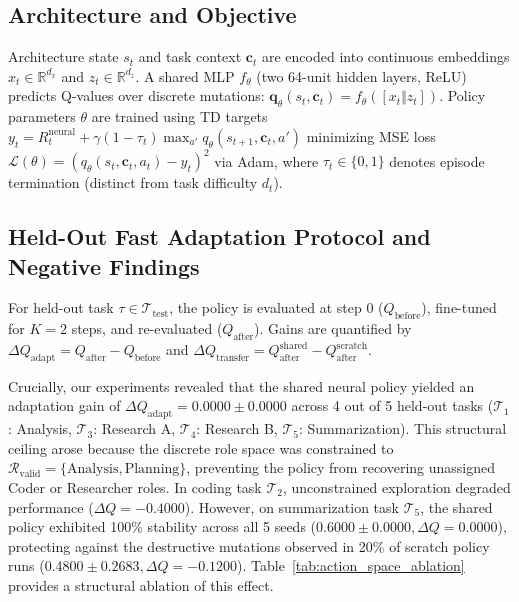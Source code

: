 \documentclass[conference]{IEEEtran}
\begin{document}
\subsection{Architecture and Objective}
Architecture state $s_t$ and task context $\mathbf{c}_t$ are encoded into continuous embeddings $x_t \in \mathbb{R}^{d_x}$ and $z_t \in \mathbb{R}^{d_z}$. A shared MLP $f_\theta$ (two 64-unit hidden layers, ReLU) predicts Q-values over discrete mutations: $\mathbf{q}_\theta(s_t, \mathbf{c}_t) = f_\theta([x_t \Vert z_t])$. Policy parameters $\theta$ are trained using TD targets $y_t = R_t^{\mathrm{neural}} + \gamma(1 - \tau_t) \max_{a'} q_\theta(s_{t+1}, \mathbf{c}_t, a')$ minimizing MSE loss $\mathcal{L}(\theta) = (q_\theta(s_t, \mathbf{c}_t, a_t) - y_t)^2$ via Adam, where $\tau_t \in \{0, 1\}$ denotes episode termination (distinct from task difficulty $d_t$).

\subsection{Held-Out Fast Adaptation Protocol and Negative Findings}
For held-out task $\tau \in \mathcal{T}_{\mathrm{test}}$, the policy is evaluated at step 0 ($Q_{\mathrm{before}}$), fine-tuned for $K=2$ steps, and re-evaluated ($Q_{\mathrm{after}}$). Gains are quantified by $\Delta Q_{\mathrm{adapt}} = Q_{\mathrm{after}} - Q_{\mathrm{before}}$ and $\Delta Q_{\mathrm{transfer}} = Q_{\mathrm{after}}^{\mathrm{shared}} - Q_{\mathrm{after}}^{\mathrm{scratch}}$.

Crucially, our experiments revealed that the shared neural policy yielded an adaptation gain of $\Delta Q_{\mathrm{adapt}} = \mathbf{0.0000 \pm 0.0000}$ across 4 out of 5 held-out tasks ($\mathcal{T}_1$: Analysis, $\mathcal{T}_3$: Research A, $\mathcal{T}_4$: Research B, $\mathcal{T}_5$: Summarization). This structural ceiling arose because the discrete role space was constrained to $\mathcal{R}_{\mathrm{valid}} = \{\text{Analysis}, \text{Planning}\}$, preventing the policy from recovering unassigned Coder or Researcher roles. In coding task $\mathcal{T}_2$, unconstrained exploration degraded performance ($\Delta Q = -0.4000$). However, on summarization task $\mathcal{T}_5$, the shared policy exhibited 100\% stability across all 5 seeds ($0.6000 \pm 0.0000, \Delta Q = 0.0000$), protecting against the destructive mutations observed in 20\% of scratch policy runs ($0.4800 \pm 0.2683, \Delta Q = -0.1200$). Table~\ref{tab:action_space_ablation} provides a structural ablation of this effect.
\end{document}
